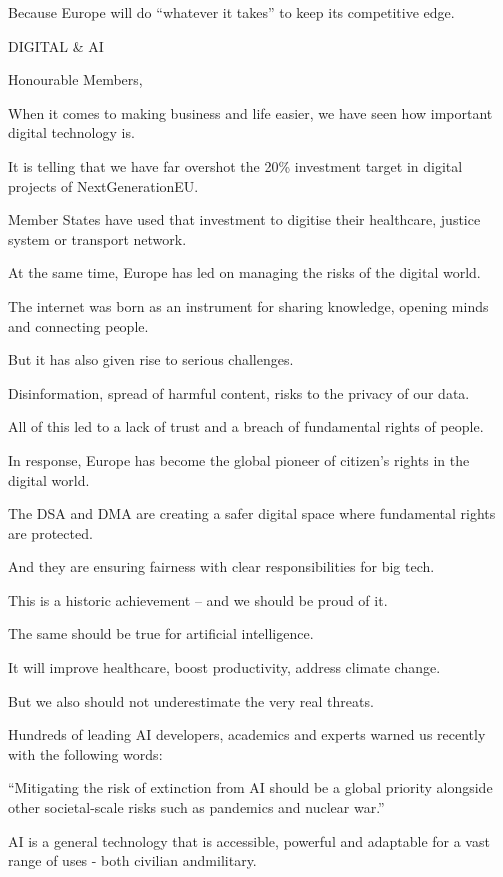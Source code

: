 \documentclass[a4paper,11pt]{article}
\begin{document}
Because Europe will do “whatever it takes” to keep its competitive edge. 

 

DIGITAL \& AI

Honourable Members, 

When it comes to making business and life easier, we have seen how important digital technology is. 

It is telling that we have far overshot the 20\% investment target in digital projects of NextGenerationEU. 

Member States have used that investment to digitise their healthcare, justice system or transport network.

At the same time, Europe has led on managing the risks of the digital world. 

The internet was born as an instrument for sharing knowledge, opening minds and connecting people. 

But it has also given rise to serious challenges.

Disinformation, spread of harmful content, risks to the privacy of our data. 

All of this led to a lack of trust and a breach of fundamental rights of people. 

In response, Europe has become the global pioneer of citizen's rights in the digital world. 

The DSA and DMA are creating a safer digital space where fundamental rights are protected. 

And they are ensuring fairness with clear responsibilities for big tech. 

This is a historic achievement – and we should be proud of it. 

The same should be true for artificial intelligence.  

It will improve healthcare, boost productivity, address climate change.

But we also should not underestimate the very real threats. 

Hundreds of leading AI developers, academics and experts warned us recently with the following words:

“Mitigating the risk of extinction from AI should be a global priority alongside other societal-scale risks such as pandemics and nuclear war.”

AI is a general technology that is accessible, powerful and adaptable for a vast range of uses - both civilian andmilitary. 
\end{document}

